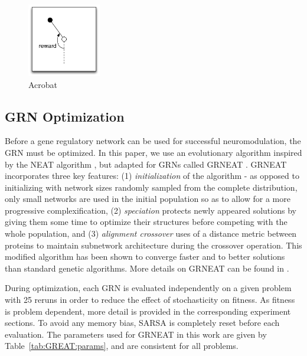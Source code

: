 \begin{figure}[ht!]
\begin{minipage}[t]{0.19\linewidth}
\center
\includegraphics[height=3.2cm]{ACP_problem.pdf}
\caption{Acrobat
}\label{fig:ACP:problem}
\end{minipage}
\end{figure}

\subsection{GRN Optimization}
Before a gene regulatory network can be used for successful neuromodulation, the GRN must be optimized. In this paper, we use an evolutionary algorithm inspired by the NEAT algorithm \cite{stanley2002evolving}, but adapted for GRNs called GRNEAT \cite{cussatblanc2015grneat}. GRNEAT incorporates three key features:
(1) \emph{initialization} of the algorithm  - as opposed to initializing with network sizes randomly sampled from the complete distribution, only small networks are used in the initial population so as to allow for a more progressive complexification,
(2) \emph{speciation} protects newly appeared solutions by giving them some time to optimize their structures before competing with the whole population, and
(3) \emph{alignment crossover} uses of a distance metric between proteins to maintain subnetwork architecture during the crossover operation.
This modified algorithm has been shown to converge faster and to better solutions than standard genetic algorithms. More details on GRNEAT can be found in \cite{cussatblanc2015grneat}.

During optimization, each GRN is evaluated independently on a given problem with 25 reruns in order to reduce the effect of stochasticity on fitness. As fitness is problem dependent, more detail is provided in the corresponding experiment sections. To avoid any memory bias, SARSA is completely reset before each evaluation. The parameters used for GRNEAT in this work are given by Table~\ref{tab:GREAT:params}, and are consistent for all problems. 

